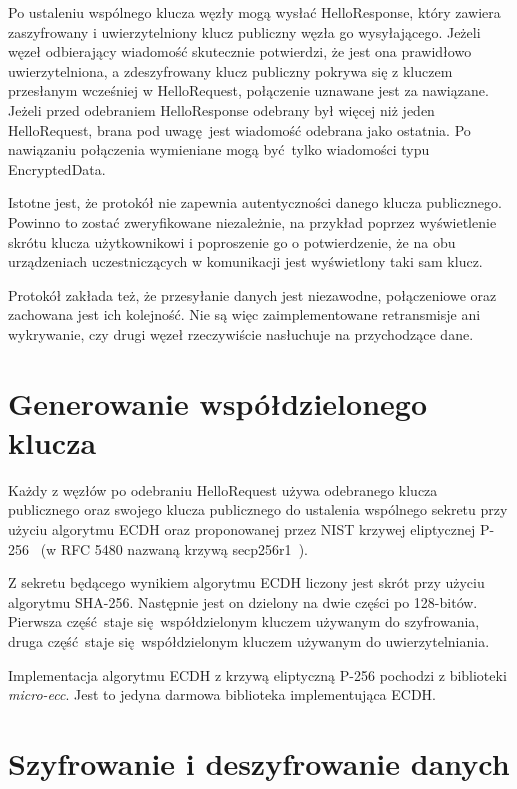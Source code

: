 Po ustaleniu wspólnego klucza węzły mogą wysłać HelloResponse, który zawiera zaszyfrowany i uwierzytelniony klucz publiczny węzła go wysyłającego. Jeżeli węzeł odbierający wiadomość skutecznie potwierdzi, że jest ona prawidłowo uwierzytelniona, a zdeszyfrowany klucz publiczny pokrywa się z kluczem przesłanym wcześniej w HelloRequest, połączenie uznawane jest za nawiązane. Jeżeli przed odebraniem HelloResponse odebrany był więcej niż jeden HelloRequest, brana pod uwagę jest wiadomość odebrana jako ostatnia. Po nawiązaniu połączenia wymieniane mogą być tylko wiadomości typu EncryptedData.

Istotne jest, że protokół nie zapewnia autentyczności danego klucza publicznego. Powinno to zostać zweryfikowane niezależnie, na przykład poprzez wyświetlenie skrótu klucza użytkownikowi i poproszenie go o potwierdzenie, że na obu urządzeniach uczestniczących w komunikacji jest wyświetlony taki sam klucz.

Protokół zakłada też, że przesyłanie danych jest niezawodne, połączeniowe oraz zachowana jest ich kolejność. Nie są więc zaimplementowane retransmisje ani wykrywanie, czy drugi węzeł rzeczywiście nasłuchuje na przychodzące dane.

\section{Generowanie współdzielonego klucza}
\label{sec:sharedkey}

Każdy z węzłów po odebraniu HelloRequest używa odebranego klucza publicznego oraz swojego klucza publicznego do ustalenia wspólnego sekretu przy użyciu algorytmu ECDH oraz proponowanej przez NIST krzywej eliptycznej P-256~\cite{kerry2013digital} (w RFC 5480 nazwaną krzywą secp256r1~\cite{turner2009elliptic}).

Z sekretu będącego wynikiem algorytmu ECDH liczony jest skrót przy użyciu algorytmu SHA-256. Następnie jest on dzielony na dwie części po 128-bitów. Pierwsza część staje się współdzielonym kluczem używanym do szyfrowania, druga część staje się współdzielonym kluczem używanym do uwierzytelniania.

Implementacja algorytmu ECDH z krzywą eliptyczną P-256 pochodzi z biblioteki \emph{micro-ecc}. Jest to jedyna darmowa biblioteka implementująca ECDH.

\section{Szyfrowanie i deszyfrowanie danych}
\label{sec:encrypt}


